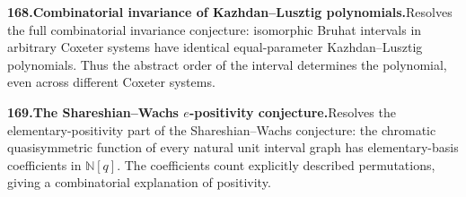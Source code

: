 \documentclass[11pt,a4paper]{article}
\begin{document}
  \par \begin{minipage}{\linewidth}
  \fontsize{10.5}{12.6}\selectfont\RaggedRight
  \hypertarget{result 168}{}
  {\bfseries\textcolor{muted}{168.}\enspace Combinatorial invariance of Kazhdan--Lusztig polynomials.}\enspace Resolves the full combinatorial invariance conjecture: isomorphic Bruhat intervals in arbitrary Coxeter systems have identical equal-parameter Kazhdan--Lusztig polynomials. Thus the abstract order of the interval determines the polynomial, even across different Coxeter systems.\par
  \end{minipage}\par\vspace{5pt}



  \par \begin{minipage}{\linewidth}
  \fontsize{10.5}{12.6}\selectfont\RaggedRight
  \hypertarget{result 169}{}
  {\bfseries\textcolor{muted}{169.}\enspace The Shareshian--Wachs $e$-positivity conjecture.}\enspace Resolves the elementary-positivity part of the Shareshian--Wachs conjecture: the chromatic quasisymmetric function of every natural unit interval graph has elementary-basis coefficients in $\mathbb N[q]$. The coefficients count explicitly described permutations, giving a combinatorial explanation of positivity.\par
  \end{minipage}\par\vspace{5pt}
\end{document}
